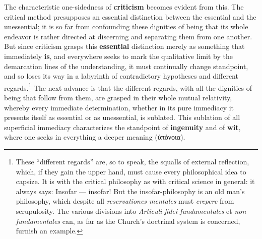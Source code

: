 \documentclass[12pt,a4paper,openany]{book}
\newcommand{\opage}[1]{\marginnote{\footnotesize\textit{[#1]}}}
\begin{document}
The characteristic one-sidedness of \textbf{criticism} becomes evident from this. The critical method presupposes an essential distinction between the essential and the unessential; it is so far from confounding these dignities of being that its whole endeavor is rather directed at discerning and separating them from one another. But since criticism grasps this \textbf{essential} distinction merely as something that immediately \textbf{is}, and everywhere seeks to mark the qualitative limit by the demarcation lines of the understanding, it must continually change standpoint, and so loses its way in a labyrinth of contradictory hypotheses and different regards.\footnote{These ``different regards'' are, so to speak, the squalls of external reflection, which, if they gain the upper hand, must cause every philosophical idea to capsize. It is with the critical philosophy as with critical science in general: it always says: Insofar — insofar! But the insofar-philosophy is an old man's philosophy, which despite all \textit{reservationes mentales} must \textit{crepere} from scrupulosity. The various divisions into \textit{Articuli fidei fundamentales} et \textit{non fundamentales} can, as far as the Church's doctrinal system is concerned, furnish an example.}
 The next advance is that the different regards, with all the dignities of being that follow from them, are grasped in their whole mutual relativity, whereby every immediate determination, whether in its pure immediacy it presents itself as essential or as unessential, is sublated. This sublation of all superficial
\setcounter{footnote}{0}%
\opage{87}immediacy characterizes the standpoint of \textbf{ingenuity} and of \textbf{wit}, where one seeks in everything a deeper meaning (ὑπόνοια).
\end{document}
